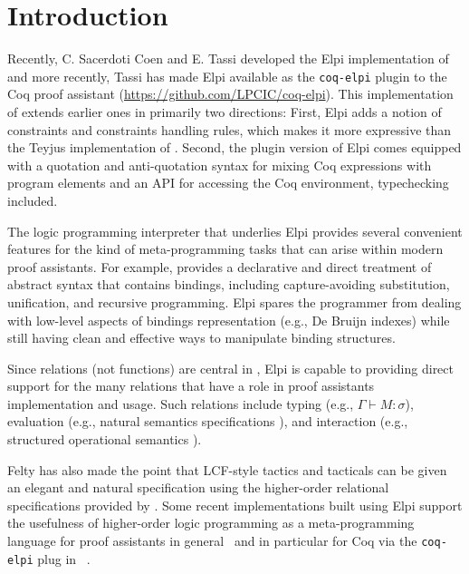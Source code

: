 \section{Introduction}
\label{sec:intro}

Recently, C. Sacerdoti Coen and E. Tassi developed the Elpi
implementation \cite{dunchev15lpar} of \lP \cite{miller12proghol} and
more recently, Tassi has made Elpi available as the \texttt{coq-elpi} plugin to the Coq
proof assistant \cite{tassi18coqpl} (\url{https://github.com/LPCIC/coq-elpi}).  This implementation of \lP
extends earlier ones in primarily two directions:  First,
Elpi adds a notion of constraints and constraints handling rules, which makes it more expressive than
the Teyjus implementation \cite{nadathur99cade} of \lP. Second, the
plugin version of Elpi comes equipped with  a quotation and anti-quotation syntax for mixing
Coq expressions with \lP program elements and an API for accessing the
Coq environment, typechecking included.

The logic programming interpreter that underlies Elpi provides several
convenient features for the kind of meta-programming tasks that can
arise within modern proof assistants.  For example, \lP provides a
declarative and direct treatment of abstract syntax that contains
bindings, including capture-avoiding substitution,
unification, and recursive programming.  Elpi spares the
programmer from dealing with low-level aspects of bindings
representation (e.g., De Bruijn indexes) while still having clean and
effective ways to manipulate binding structures.

Since relations (not functions) are central in \lP, Elpi is
capable to providing direct support for the many relations that have a
role in proof assistants implementation and usage.  Such relations include typing (e.g.,
$\Gamma\vdash M\colon\sigma$), evaluation (e.g., natural semantics
specifications \cite{kahn87stacs,hannan93jfp}), and interaction (e.g.,
structured operational semantics \cite{plotkin81,milner89book}).

Felty has also
made the point that LCF-style tactics and tacticals can be given an
elegant and natural specification using the higher-order relational
specifications provided by \lP \cite{felty93jar}.  Some recent
implementations built using Elpi
support the usefulness of
higher-order logic programming as a meta-programming language 
for proof assistants in general~\cite{DunchevCT16,coen19mscs} and in particular
for Coq via the \texttt{coq-elpi} plug in~\cite{tassi19itp,CohenST20} .
%

